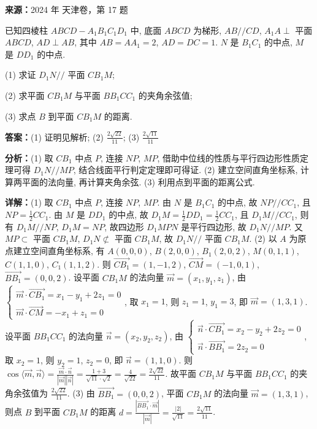 \begin{question}[points=15]
\textbf{来源：}2024 年 天津卷，第 17 题\par
已知四棱柱 $ABCD-A_1B_1C_1D_1$ 中, 底面 $ABCD$ 为梯形, $AB//CD$, $A_1A\perp$ 平面 $ABCD$, $AD\perp AB$, 其中 $AB=AA_1=2$, $AD=DC=1$. $N$ 是 $B_1C_1$ 的中点, $M$ 是 $DD_1$ 的中点.

(1) 求证 $D_1N//$ 平面 $CB_1M$;

(2) 求平面 $CB_1M$ 与平面 $BB_1CC_1$ 的夹角余弦值;

(3) 求点 $B$ 到平面 $CB_1M$ 的距离.
\begin{solution}
\textbf{答案：}(1) 证明见解析; (2) $\frac{2\sqrt{22}}{11}$; (3) $\frac{2\sqrt{11}}{11}$

\textbf{分析：}(1) 取 $CB_1$ 中点 $P$, 连接 $NP$, $MP$, 借助中位线的性质与平行四边形性质定理可得 $D_1N//MP$, 结合线面平行判定定理即可得证. (2) 建立空间直角坐标系, 计算两平面的法向量, 再计算夹角余弦. (3) 利用点到平面的距离公式.

\textbf{详解：}(1) 取 $CB_1$ 中点 $P$, 连接 $NP$, $MP$. 由 $N$ 是 $B_1C_1$ 的中点, 故 $NP//CC_1$, 且 $NP=\frac{1}{2}CC_1$. 由 $M$ 是 $DD_1$ 的中点, 故 $D_1M=\frac{1}{2}DD_1=\frac{1}{2}CC_1$, 且 $D_1M//CC_1$, 则有 $D_1M//NP$, $D_1M=NP$, 故四边形 $D_1MPN$ 是平行四边形, 故 $D_1N//MP$. 又 $MP\subset$ 平面 $CB_1M$, $D_1N\not\subset$ 平面 $CB_1M$, 故 $D_1N//$ 平面 $CB_1M$.
(2) 以 $A$ 为原点建立空间直角坐标系, 有 $A(0,0,0)$, $B(2,0,0)$, $B_1(2,0,2)$, $M(0,1,1)$, $C(1,1,0)$, $C_1(1,1,2)$. 则 $\overrightarrow{CB_1}=(1,-1,2)$, $\overrightarrow{CM}=(-1,0,1)$, $\overrightarrow{BB_1}=(0,0,2)$. 设平面 $CB_1M$ 的法向量 $\vec{m}=(x_1,y_1,z_1)$, 由 $\begin{cases} \vec{m}\cdot\overrightarrow{CB_1}=x_1-y_1+2z_1=0\\ \vec{m}\cdot\overrightarrow{CM}=-x_1+z_1=0 \end{cases}$, 取 $x_1=1$, 则 $z_1=1$, $y_1=3$, 即 $\vec{m}=(1,3,1)$. 设平面 $BB_1CC_1$ 的法向量 $\vec{n}=(x_2,y_2,z_2)$, 由 $\begin{cases} \vec{n}\cdot\overrightarrow{CB_1}=x_2-y_2+2z_2=0\\ \vec{n}\cdot\overrightarrow{BB_1}=2z_2=0 \end{cases}$, 取 $x_2=1$, 则 $y_2=1$, $z_2=0$, 即 $\vec{n}=(1,1,0)$. 则 $\cos\langle\vec{m},\vec{n}\rangle=\frac{\vec{m}\cdot\vec{n}}{|\vec{m}||\vec{n}|}=\frac{1+3}{\sqrt{11}\cdot\sqrt{2}}=\frac{4}{\sqrt{22}}=\frac{2\sqrt{22}}{11}$. 故平面 $CB_1M$ 与平面 $BB_1CC_1$ 的夹角余弦值为 $\frac{2\sqrt{22}}{11}$.
(3) 由 $\overrightarrow{BB_1}=(0,0,2)$, 平面 $CB_1M$ 的法向量 $\vec{m}=(1,3,1)$, 则点 $B$ 到平面 $CB_1M$ 的距离 $d=\frac{|\overrightarrow{BB_1}\cdot\vec{m}|}{|\vec{m}|}=\frac{|2|}{\sqrt{11}}=\frac{2\sqrt{11}}{11}$.
\end{solution}
\end{question}

